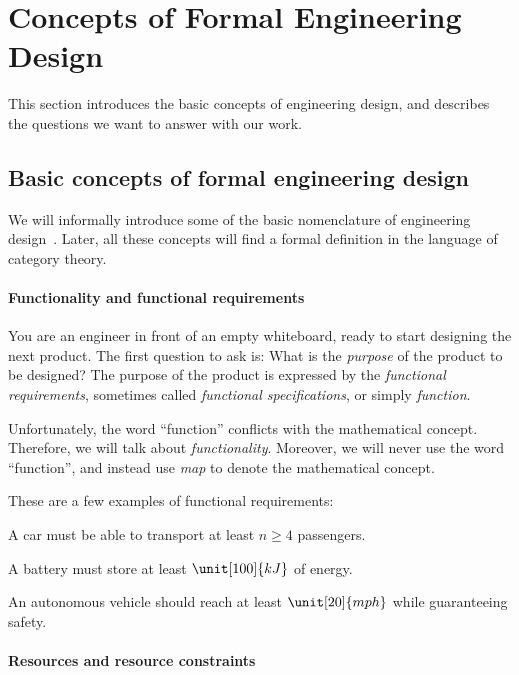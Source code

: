 \section{Concepts of  Formal Engineering Design}
This section introduces the basic concepts of engineering design, and describes the questions we want to answer with our work.

\subsection{Basic concepts of formal engineering design}
We will informally introduce some of the basic nomenclature of engineering
design~\cite{antonsson2005formal}. Later, all these concepts will find a formal
definition in the language of category theory.

\paragraph{Functionality and functional requirements} You are an engineer in front of an empty whiteboard, ready to start designing the next product.
The first question to ask is: What is the \emph{purpose} of the product to be designed? The purpose of the product is expressed by the \emph{functional requirements}, sometimes called
\emph{functional specifications}, or simply \emph{function}.

Unfortunately, the word ``function'' conflicts with the mathematical concept. Therefore, we
will talk  about \emph{functionality}. Moreover, we will never use the word ``function'', and
instead use \emph{map} to denote the mathematical concept.

\begin{example}
    These are a few examples of functional requirements:
    \begin{compactitem}
        \item A car must be able to transport at least $n \geq 4$ passengers.
        \item A battery must store at least $\unit[100]{kJ}$ of energy.
        \item An autonomous vehicle should reach at least $\unit[20]{mph}$ while guaranteeing safety.
    \end{compactitem}
\end{example}

\paragraph{Resources and resource constraints}

